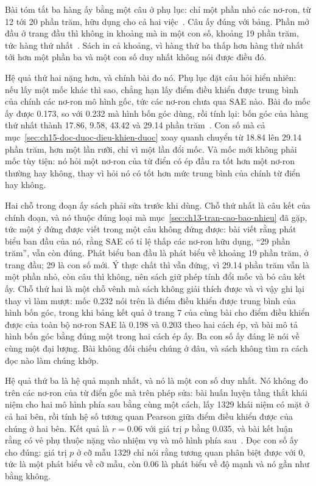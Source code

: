 Bài tóm tắt ba hàng ấy bằng một câu ở phụ lục: chỉ một phần nhỏ các nơ-ron, từ
12 tới 20 phần trăm, hữu dụng cho cả hai việc~\autocite{p32cbmsae}. Câu ấy đúng
với bảng. Phần mở đầu ở trang đầu thì không in khoảng mà in một con số, khoảng
19 phần trăm, tức hàng thứ nhất~\autocite{p32cbmsae}. Sách in cả khoảng, vì hàng
thứ ba thấp hơn hàng thứ nhất tới hơn một phần ba và một con số duy nhất không
nói được điều đó.

%
Hệ quả thứ hai nặng hơn, và chính bài đo nó. Phụ lục đặt câu hỏi hiển nhiên: nếu
lấy một mốc khác thì sao, chẳng hạn lấy điểm điều khiển được trung bình của
chính các nơ-ron mô hình gốc, tức các nơ-ron chưa qua SAE nào.
Bài đo mốc ấy được 0.173, so với 0.232 mà hình bốn góc dùng, rồi tính lại: bốn
góc của hàng thứ nhất thành 17.86, 9.58, 43.42 và 29.14 phần
trăm~\autocite{p32cbmsae}. Con số mà cả mục~\ref{sec:ch15-doc-duoc-dieu-khien-duoc}
xoay quanh chuyển từ 18.84 lên 29.14 phần trăm, hơn một lần rưỡi, chỉ vì một
lần đổi mốc. Và mốc mới không phải mốc tùy tiện: nó hỏi một nơ-ron của từ điển
có ép đầu ra tốt hơn một nơ-ron thường hay không, thay vì hỏi nó có tốt hơn mức
trung bình của chính từ điển hay không.

%
Hai chỗ trong đoạn ấy sách phải sửa trước khi dùng. Chỗ thứ nhất là câu kết của
chính đoạn, và nó thuộc đúng loại mà mục~\ref{sec:ch13-tran-cao-bao-nhieu} đã
gặp, tức một ý đứng được viết trong một câu không đứng được: bài viết rằng phát
biểu ban đầu của nó, rằng SAE có tỉ lệ thấp các nơ-ron hữu dụng, \enquote{29
phần trăm}, vẫn còn đúng. Phát biểu ban đầu là phát biểu về khoảng 19 phần trăm,
ở trang đầu; 29 là con số mới. Ý thực chất thì vẫn đứng, vì 29.14 phần trăm vẫn
là một phần nhỏ, còn câu thì không, nên sách giữ phép tính đổi mốc và bỏ câu kết
ấy. Chỗ thứ hai là một chỗ vênh mà
sách không giải thích được và vì vậy ghi lại thay vì làm mượt: mốc 0.232 nói
trên là điểm điều khiển được trung bình của hình bốn góc, trong khi bảng kết quả
ở trang 7 của cùng bài cho điểm điều khiển được của toàn bộ nơ-ron SAE là 0.198
và 0.203 theo hai cách ép, và bài mô tả hình bốn góc bằng
đúng một trong hai cách ép ấy. Ba con số ấy đáng lẽ nói về cùng một đại lượng.
Bài không đối chiếu chúng ở đâu, và sách không tìm ra cách đọc nào làm chúng
khớp.

%
Hệ quả thứ ba là hệ quả mạnh nhất, và nó là một con số duy nhất. Nó không đo
trên các nơ-ron của từ điển gốc mà trên phép sửa: bài huấn luyện tầng thắt khái
niệm cho hai mô hình phía sau bằng cùng một cách, lấy 1329 khái niệm có mặt ở cả
hai bên, rồi tính hệ số tương quan Pearson giữa điểm điều khiển được của chúng ở
hai bên. Kết quả là $r = 0.06$ với giá trị $p$ bằng 0.035, và bài kết luận rằng
 có vẻ phụ thuộc nặng vào nhiệm vụ và mô
hình phía sau~\autocite{p32cbmsae}. Đọc con số ấy cho đúng: giá trị $p$ ở cỡ mẫu
1329 chỉ nói rằng tương quan phân biệt được với 0, tức là một phát biểu về cỡ
mẫu, còn $0.06$ là phát biểu về độ mạnh và nó gần như bằng không.

